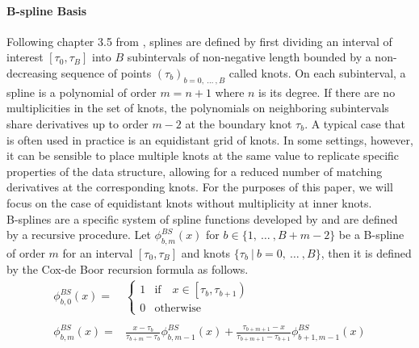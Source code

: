 \documentclass[11pt,twoside,a4paper]{article}
\begin{document}
	\paragraph{B-spline Basis} Following chapter 3.5 from \cite{ramsay_functional_2005}, splines are defined by first dividing an interval of interest $[\tau_0, \tau_B]$ into $B$ subintervals of non-negative length bounded by a non-decreasing sequence of points $(\tau_b)_{b = 0, \: \dots \:, B}$ called knots. On each subinterval, a spline is a polynomial of order $m = n+1$ where $n$ is its degree. If there are no multiplicities in the set of knots, the polynomials on neighboring subintervals share derivatives up to order $m-2$ at the boundary knot $\tau_b$. A typical case that is often used in practice is an equidistant grid of knots. In some settings, however, it can be sensible to place multiple knots at the same value to replicate specific properties of the data structure, allowing for a reduced number of matching derivatives at the corresponding knots. For the purposes of this paper, we will focus on the case of equidistant knots without multiplicity at inner knots.\\
	
	B-splines are a specific system of spline functions developed by \cite{de_boor_practical_1978} and are defined by a recursive procedure. Let $\phi_{b,m}^{BS}(x)$ for $b \in \{1, \: \dots \:, B + m - 2\}$ be a B-spline of order $m$ for an interval $[\tau_0, \tau_B]$ and knots $\{\tau_b \: \vert \: b = 0, \:\dots \:, B\}$, then it is defined by the Cox-de Boor recursion formula as follows. 
	\begin{equation}
		\begin{split}
			\phi_{b,0}^{BS}(x) = &
			\begin{cases}
				1 & \text{if} \quad x \in \left[\tau_b, \tau_{b+1}\right)\\
				0 & \text{otherwise}
			\end{cases}\\ \\
			\phi_{b,m}^{BS}(x) = &\frac{x - \tau_b}{\tau_{b+m} - \tau_b} \phi_{b,m-1}^{BS}(x) + \frac{\tau_{b+m+1} - x}{\tau_{b+m+1} - \tau_{b+1}} \phi_{b+1,m-1}^{BS}(x)
		\end{split}
	\end{equation}
	
\end{document}
